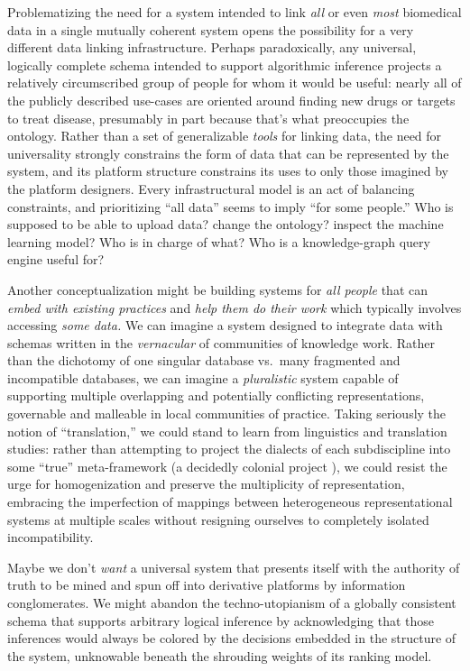 Problematizing the need for a system intended to link \emph{all} or even
\emph{most} biomedical data in a single mutually coherent system opens
the possibility for a very different data linking infrastructure.
Perhaps paradoxically, any universal, logically complete schema intended
to support algorithmic inference projects a relatively circumscribed
group of people for whom it would be useful: nearly all of the publicly
described use-cases are oriented around finding new drugs or targets to
treat disease, presumably in part because that's what preoccupies the
ontology. Rather than a set of generalizable \emph{tools} for linking
data, the need for universality strongly constrains the form of data
that can be represented by the system, and its platform structure
constrains its uses to only those imagined by the platform designers.
Every infrastructural model is an act of balancing constraints, and
prioritizing ``all data'' seems to imply ``for some people.'' Who is
supposed to be able to upload data? change the ontology? inspect the
machine learning model? Who is in charge of what? Who is a
knowledge-graph query engine useful for?

Another conceptualization might be building systems for \emph{all
people} that can \emph{embed with existing practices} and \emph{help
them do their work} which typically involves accessing \emph{some data.}
We can imagine a system designed to integrate data with schemas written
in the \emph{vernacular} of communities of knowledge work. Rather than
the dichotomy of one singular database vs.~many fragmented and
incompatible databases, we can imagine a \emph{pluralistic} system
capable of supporting multiple overlapping and potentially conflicting
representations, governable and malleable in local communities of
practice. Taking seriously the notion of ``translation,'' we could stand
to learn from linguistics and translation studies: rather than
attempting to project the dialects of each subdiscipline into some
``true'' meta-framework (a decidedly colonial project \citep{shammaTranslationColonialism2018} ), we could resist the urge for
homogenization and preserve the multiplicity of representation,
embracing the imperfection of mappings between heterogeneous
representational systems at multiple scales without resigning ourselves
to completely isolated incompatibility.

Maybe we don't \emph{want} a universal system that presents itself with
the authority of truth to be mined and spun off into derivative
platforms by information conglomerates. We might abandon the
techno-utopianism of a globally consistent schema that supports
arbitrary logical inference by acknowledging that those inferences would
always be colored by the decisions embedded in the structure of the
system, unknowable beneath the shrouding weights of its ranking model.

